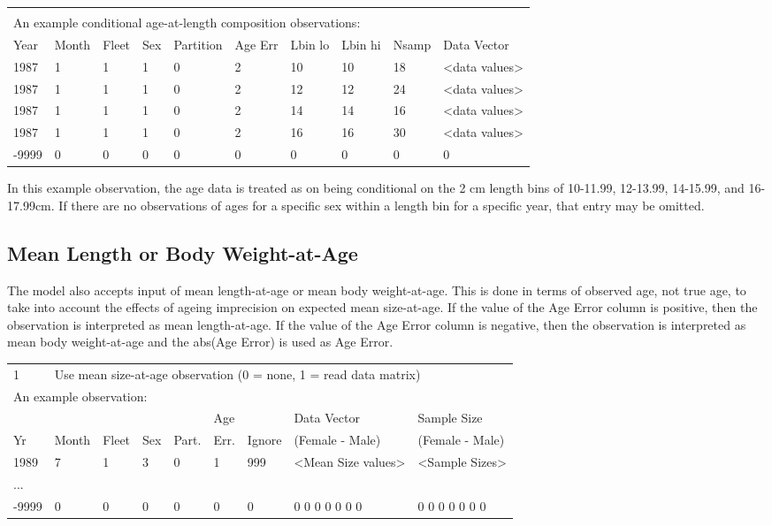 \begin{tabular}{p{0.9cm} p{1cm} p{0.9cm} p{0.9cm} p{1.5cm} p{0.9cm} p{0.9cm} p{0.9cm} p{1cm} p{2.4cm}}
	\multicolumn{10}{l}{ }\\
	\multicolumn{10}{l}{An example conditional age-at-length composition observations:}\\
	\hline
	Year & Month & Fleet & Sex & Partition & Age Err & Lbin lo & Lbin hi & Nsamp & Data Vector \Tstrut\\
	\hline
	1987 & 1 & 1 & 1 & 0 & 2 & 10 & 10 & 18 & <data values>\Tstrut\\
	1987 & 1 & 1 & 1 & 0 & 2 & 12 & 12 & 24 & <data values>\Tstrut\\
	1987 & 1 & 1 & 1 & 0 & 2 & 14 & 14 & 16 & <data values>\Tstrut\\
	1987 & 1 & 1 & 1 & 0 & 2 & 16 & 16 & 30 & <data values>\Tstrut\\
	-9999 & 0 & 0 & 0 & 0 & 0 & 0 & 0 & 0 & 0\Bstrut\\
	\hline
\end{tabular}

In this example observation, the age data is treated as on being conditional on the 2 cm length bins of 10-11.99, 12-13.99, 14-15.99, and 16-17.99cm. If there are no observations of ages for a specific sex within a length bin for a specific year, that entry may be omitted.

\subsection{Mean Length or Body Weight-at-Age}
The model also accepts input of mean length-at-age or mean body weight-at-age.  This is done in terms of observed age, not true age, to take into account the effects of ageing imprecision on expected mean size-at-age.  If the value of the Age Error column is positive, then the observation is interpreted as mean length-at-age.  If the value of the Age Error column is negative, then the observation is interpreted as mean body weight-at-age and the abs(Age Error) is used as Age Error.

\begin{center}
	\begin{tabular}{p{0.75cm} p{1cm} p{0.75cm} p{1cm} p{0.75cm} p{1cm} p{1cm} p{3.2cm} p{3.2cm} }
		\hline
		1 & \multicolumn{8}{l}{Use mean size-at-age observation (0 = none, 1 = read data matrix)} \Tstrut\\
		\multicolumn{9}{l}{An example observation:}\Bstrut\\
		\hline
		   &       &       &     &       & Age  &        & Data Vector     & Sample Size \Tstrut\\
		Yr & Month & Fleet & Sex & Part. & Err. & Ignore & (Female - Male) & (Female - Male) \Bstrut\\
		\hline
		1989  & 7 & 1 & 3 & 0 & 1 & 999 & <Mean Size values> & <Sample Sizes> \Tstrut\\
		...   &   &   &   &   &   &   &  & \\
		-9999 & 0 & 0 & 0 & 0 & 0 & 0 &  0 0 0 0 0 0 0 & 0 0 0 0 0 0 0 \Bstrut\\
		\hline
	\end{tabular}
\end{center}


